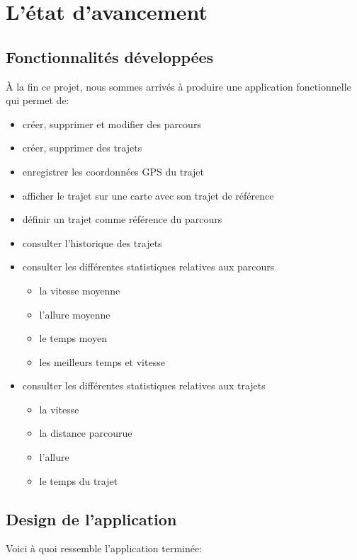 \chapter{L'état d'avancement}
\section{Fonctionnalités développées}
À la fin ce projet, nous sommes arrivés à produire une application fonctionnelle qui permet de:\bigskip

\begin{itemize}
 	\item créer, supprimer et modifier des parcours
 	\item créer, supprimer des trajets
 	\item enregistrer les coordonnées GPS du trajet 
 	\item afficher le trajet sur une carte avec son trajet de référence
 	\item définir un trajet comme référence du parcours
	\item consulter l'historique des trajets 
	\item consulter les différentes statistiques relatives aux parcours 
	\begin{itemize}
		\item la vitesse moyenne
		\item l'allure moyenne
		\item le temps moyen 
		\item les meilleurs temps et vitesse 
	\end{itemize}
 	\item consulter les différentes statistiques relatives aux trajets 
	\begin{itemize}
		\item la vitesse
		\item la distance parcourue
		\item l'allure
		\item le temps du trajet 
	\end{itemize}
\end{itemize}\bigskip

\newpage

\section{Design de l'application}
Voici à quoi ressemble l'application terminée:\bigskip 

